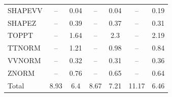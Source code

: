 \begin{table}[H]
\begin{center}
\begin{footnotesize}
\begin{tabular}{lcccccc}
				SHAPEVV & -- &  0.04 & -- &  0.04 & -- &  0.19 \\
				SHAPEZ & -- &  0.39 & -- &  0.37 & -- &  0.31 \\
				TOPPT & -- &  1.64 & -- &  2.3 & -- &  2.19 \\
				TTNORM & -- &  1.21 & -- &  0.98 & -- &  0.84 \\
				VVNORM & -- &  0.32 & -- &  0.31 & -- &  0.36 \\
				ZNORM & -- &  0.76 & -- &  0.65 & -- &  0.64 \\
				Total &  8.93  &  6.4 &  8.67  &  7.21 &  11.17  &  6.46 \\ \hline \hline
			\end{tabular}
			\label{tab:SysUncertainties_800}
        \end{footnotesize}
	\end{center}
\end{table}


